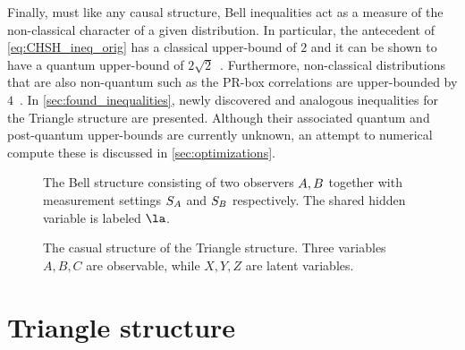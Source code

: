 \documentclass[aps, 10pt, english, twoside, pra, nofootinbib, tightenlines, longbibliography, superscriptaddress]{revtex4-1}
\begin{document}
    Finally, must like any causal structure, Bell inequalities act as a measure of the non-classical character of a given distribution. In particular, the antecedent of \cref{eq:CHSH_ineq_orig} has a classical upper-bound of $2$ and it can be shown to have a quantum upper-bound of $2\sqrt{2}$~\cite{Cirelson_1980}. Furthermore, non-classical distributions that are also non-quantum such as the PR-box correlations are upper-bounded by $4$~\cite{PR_1995}. In \cref{sec:found_inequalities}, newly discovered and analogous inequalities for the Triangle structure are presented. Although their associated quantum and post-quantum upper-bounds are currently unknown, an attempt to numerical compute these is discussed in \cref{sec:optimizations}.

    \begin{figure}
    \begin{nscenter}
        \begin{minipage}[t]{.48\textwidth}
            \centering
            \scalebox{1.0}{}
            \caption{The Bell structure consisting of two observers $A, B$ together with measurement settings $S_{A}$ and $S_{B}$ respectively. The shared hidden variable is labeled $\la$.}
            \label{fig:bell_structure}
        \end{minipage}\hspace{0.04\textwidth}%
        \begin{minipage}[t]{.48\textwidth}
            \centering
            \scalebox{1.0}{}
            \caption{The casual structure of the Triangle structure. Three variables $A,B,C$ are observable, while $X, Y, Z$ are latent variables.}
            \label{fig:triangle_structure}
        \end{minipage}
    \end{nscenter}
    \end{figure}
    \section{Triangle structure}
    \label{sec:triangle_structure}
\end{document}

